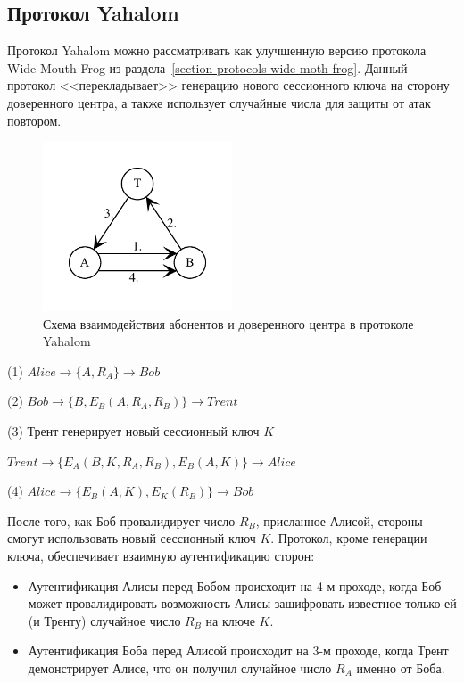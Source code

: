 \subsection{Протокол Yahalom}\label{section-protocols-yahalom}

Протокол Yahalom можно рассматривать как улучшенную версию протокола Wide-Mouth Frog из раздела~\ref{section-protocols-wide-moth-frog}. Данный протокол <<перекладывает>> генерацию нового сессионного ключа на сторону доверенного центра, а также использует случайные числа для защиты от атак повтором.

\begin{figure}
    \centering
    \includegraphics[width=0.5\textwidth]{pic/key_distribution-yahalom}
    \caption{Схема взаимодействия абонентов и доверенного центра в протоколе Yahalom\label{fig:key_distribution-yahalom}}
\end{figure}

\begin{protocol}
	\item[(1)] $Alice \to \{ A, R_A \} \to Bob$
	\item[(2)] $Bob \to \{ B, E_B( A, R_A, R_B ) \} \to Trent$
	\item[(3)] Трент генерирует новый сессионный ключ $K$
	\item[{}] $Trent \to \{ E_A( B, K, R_A, R_B ), E_B(A, K) \} \to Alice$
	\item[(4)] $Alice \to \{ E_B( A, K ), E_K( R_B ) \} \to Bob$
\end{protocol}

После того, как Боб провалидирует число $R_B$, присланное Алисой, стороны смогут использовать новый сессионный ключ $K$. Протокол, кроме генерации ключа, обеспечивает взаимную аутентификацию сторон:

\begin{itemize}
    \item Аутентификация Алисы перед Бобом происходит на 4-м проходе, когда Боб может провалидировать возможность Алисы зашифровать известное только ей (и Тренту) случайное число $R_B$ на ключе $K$.
    \item Аутентификация Боба перед Алисой происходит на 3-м проходе, когда Трент демонстрирует Алисе, что он получил случайное число $R_A$ именно от Боба.
\end{itemize}

